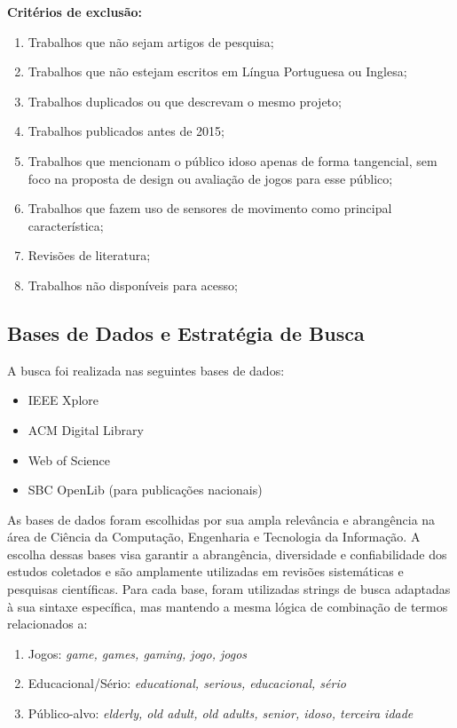 \textbf{Critérios de exclusão:}
\begin{enumerate}
    \item Trabalhos que não sejam artigos de pesquisa;
    \item Trabalhos que não estejam escritos em Língua Portuguesa ou Inglesa;
    \item Trabalhos duplicados ou que descrevam o mesmo projeto;
    \item Trabalhos publicados antes de 2015;
    \item Trabalhos que mencionam o público idoso apenas de forma tangencial, sem foco na proposta de design ou avaliação de jogos para esse público;
    \item Trabalhos que fazem uso de sensores de movimento como principal característica;
    \item Revisões de literatura;
    \item Trabalhos não disponíveis para acesso;
\end{enumerate}

\subsection{Bases de Dados e Estratégia de Busca}\label{subsec:bases_busca}

A busca foi realizada nas seguintes bases de dados:
\begin{itemize}
    \item IEEE Xplore
    \item ACM Digital Library
    \item Web of Science
    \item SBC OpenLib (para publicações nacionais)
\end{itemize}

As bases de dados foram escolhidas por sua ampla relevância e abrangência na área de Ciência da Computação, Engenharia e Tecnologia da Informação. A escolha dessas bases visa garantir a abrangência, diversidade e confiabilidade dos estudos coletados e são amplamente utilizadas em revisões sistemáticas e pesquisas científicas. Para cada base, foram utilizadas strings de busca adaptadas à sua sintaxe específica, mas mantendo a mesma lógica de combinação de termos relacionados a:

\begin{enumerate}
    \item Jogos: \textit{game, games, gaming, jogo, jogos}
    \item Educacional/Sério: \textit{educational, serious, educacional, sério}
    \item Público-alvo: \textit{elderly, old adult, old adults, senior, idoso, terceira idade}
\end{enumerate}

